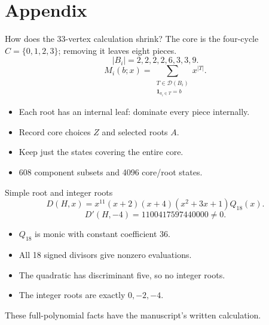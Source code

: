 \documentclass{beamer}
\begin{document}
\section{Appendix}
\begin{frame}{How does the 33-vertex calculation shrink?}
The core is the four-cycle $C=\{0,1,2,3\}$; removing it leaves eight pieces.
\[|B_i|=2,2,2,2,6,3,3,9.\]
\[M_i(b;x)=\sum_{\substack{T\in\mathcal D(B_i)\\\boldsymbol1_{a_i\in T}=b}}x^{|T|}.\]
\begin{itemize}
\item Each root has an internal leaf: dominate every piece internally.
\item Record core choices $Z$ and selected roots $A$.
\item Keep just the states covering the entire core.
\item 608 component subsets and 4096 core/root states.
\end{itemize}
\end{frame}
\begin{frame}{Simple root and integer roots}
\[D(H,x)=x^{11}(x+2)(x+4)(x^2+3x+1)Q_{18}(x).\]
\[D'(H,-4)=1100417597440000\ne0.\]
\begin{itemize}
\item $Q_{18}$ is monic with constant coefficient 36.
\item All 18 signed divisors give nonzero evaluations.
\item The quadratic has discriminant five, so no integer roots.
\item The integer roots are exactly $0,-2,-4$.
\end{itemize}
These full-polynomial facts have the manuscript's written calculation.
\end{frame}
\FormalVerification
\end{document}
